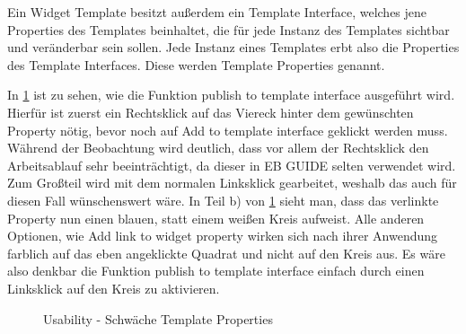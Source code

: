 Ein Widget Template besitzt außerdem ein Template Interface, welches jene Properties des Templates beinhaltet, die für jede Instanz des Templates sichtbar und veränderbar sein sollen.
Jede Instanz eines Templates erbt also die Properties des Template Interfaces.
Diese werden Template Properties genannt.\cite{studio_guide}

In \cref{fig:TemplateProperties} ist zu sehen, wie die Funktion  \glqq publish to template interface\grqq{} ausgeführt wird.
Hierfür ist zuerst ein Rechtsklick auf das Viereck hinter dem gewünschten Property nötig, bevor noch auf Add to template interface geklickt werden muss.
Während der Beobachtung wird deutlich, dass vor allem der Rechtsklick den Arbeitsablauf sehr beeinträchtigt, da dieser in EB GUIDE selten verwendet wird. 
Zum Großteil wird mit dem normalen Linksklick gearbeitet, weshalb das auch für diesen Fall wünschenswert wäre.
In Teil b) von \cref{fig:TemplateProperties} sieht man, dass das verlinkte Property nun einen blauen, statt einem weißen Kreis aufweist.
Alle anderen Optionen, wie  \glqq Add link to widget property\grqq{} wirken sich nach ihrer Anwendung farblich auf das eben angeklickte Quadrat und nicht auf den Kreis aus.
Es wäre also denkbar die Funktion \glqq publish to template interface\grqq{} einfach durch einen Linksklick auf den Kreis zu aktivieren.

\begin{figure}[H]
  \centering
  \qquad
  \caption{Usability - Schwäche Template Properties}%
  \label{fig:TemplateProperties}
\end{figure}


